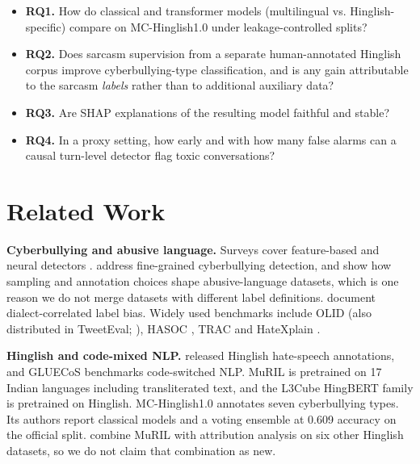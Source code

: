 \documentclass[10pt,twocolumn]{article}
\begin{document}
\begin{itemize}
\item \textbf{RQ1.} How do classical and transformer models (multilingual vs. Hinglish-specific) compare on MC-Hinglish1.0 under leakage-controlled splits?
\item \textbf{RQ2.} Does sarcasm supervision from a separate human-annotated Hinglish corpus improve cyberbullying-type classification, and is any gain attributable to the sarcasm \emph{labels} rather than to additional auxiliary data?
\item \textbf{RQ3.} Are SHAP explanations of the resulting model faithful and stable?
\item \textbf{RQ4.} In a proxy setting, how early and with how many false alarms can a causal turn-level detector flag toxic conversations?
\end{itemize}

\section{Related Work}

\textbf{Cyberbullying and abusive language.} Surveys cover feature-based and neural detectors
\cite{salawu2020survey,fortuna2018survey}. \citet{vanhee2018cyberbullying} address fine-grained cyberbullying
detection, and \citet{vidgen2020directions} show how sampling and annotation choices shape abusive-language datasets,
which is one reason we do not merge datasets with different label definitions. \citet{sap2019racial} document
dialect-correlated label bias. Widely used benchmarks include OLID \cite{zampieri2019olid} (also distributed in
TweetEval; \citealp{barbieri2020tweeteval}), HASOC \cite{mandl2019hasoc}, TRAC \cite{kumar2018trac,kumar2020trac2}
and HateXplain \cite{mathew2021hatexplain}.

\textbf{Hinglish and code-mixed NLP.} \citet{bohra2018hinglish} released Hinglish hate-speech annotations, and GLUECoS
\cite{khanuja2020gluecos} benchmarks code-switched NLP. MuRIL \cite{khanuja2021muril} is pretrained on 17 Indian
languages including transliterated text, and the L3Cube HingBERT family \cite{nayak2022hingbert} is pretrained on
Hinglish. MC-Hinglish1.0 \cite{laskar2024mchinglish} annotates seven cyberbullying types. Its authors report classical
models and a voting ensemble at 0.609 accuracy on the official split. \citet{kumar2025murilxai} combine MuRIL with
attribution analysis on six other Hinglish datasets, so we do not claim that combination as new.
\end{document}
